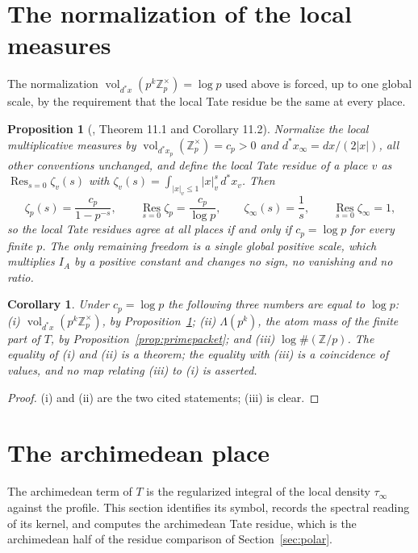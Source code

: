 \documentclass[11pt]{amsart}
\newtheorem{proposition}[theorem]{Proposition}
\newtheorem{corollary}[theorem]{Corollary}
\theoremstyle{definition}
\theoremstyle{remark}
\newcommand{\Z}{\mathbb Z}
\newcommand{\Res}{\operatorname*{Res}}
\newcommand{\vol}{\operatorname{vol}}
\begin{document}
\section{The normalization of the local measures}
\label{sec:normalization}

The normalization $\vol_{d^*x}(p^k\Z_p^\times)=\log p$ used above is forced, up to one global scale, by the
requirement that the local Tate residue be the same at every place.

\begin{proposition}[\cite{P44}, Theorem 11.1 and Corollary 11.2]
\label{prop:normalization}
Normalize the local multiplicative measures by
$\vol_{d^*x_p}(\Z_p^\times)=c_p>0$ and $d^*x_\infty=dx/(2|x|)$, all other
conventions unchanged, and define the \emph{local Tate residue} of a place $v$
as $\Res_{s=0}\zeta_v(s)$ with
$\zeta_v(s)=\int_{|x|_v\le1}|x|_v^s\,d^*x_v$.  Then
\[
  \zeta_p(s)=\frac{c_p}{1-p^{-s}},\qquad
  \Res_{s=0}\zeta_p=\frac{c_p}{\log p},\qquad
  \zeta_\infty(s)=\frac1s,\qquad \Res_{s=0}\zeta_\infty=1 ,
\]
so the local Tate residues agree at all places if and only if $c_p=\log p$ for
every finite $p$.  The only remaining freedom is a single global positive
scale, which multiplies $I_A$ by a positive constant and changes no sign, no
vanishing and no ratio.
\end{proposition}

\begin{corollary}
\label{cor:threenumbers}
Under $c_p=\log p$ the following three numbers are equal to $\log p$:
\emph{(i)} $\vol_{d^*x}(p^k\Z_p^\times)$, by
Proposition~\ref{prop:normalization}; \emph{(ii)} $\Lambda(p^k)$, the atom mass
of the finite part of $T$, by Proposition~\ref{prop:primepacket}; and
\emph{(iii)} $\log\#(\Z/p)$.  The equality of \emph{(i)} and \emph{(ii)} is a
theorem; the equality with \emph{(iii)} is a coincidence of values, and no map
relating \emph{(iii)} to \emph{(i)} is asserted.
\end{corollary}

\begin{proof}
(i) and (ii) are the two cited statements; (iii) is clear.
\end{proof}

\section{The archimedean place}
\label{sec:arch}

The archimedean term of $T$ is the regularized integral of the local density
$\tau_\infty$ against the profile.  This section identifies its symbol, records
the spectral reading of its kernel, and computes the archimedean Tate residue,
which is the archimedean half of the residue comparison of
Section~\ref{sec:polar}.
\end{document}

